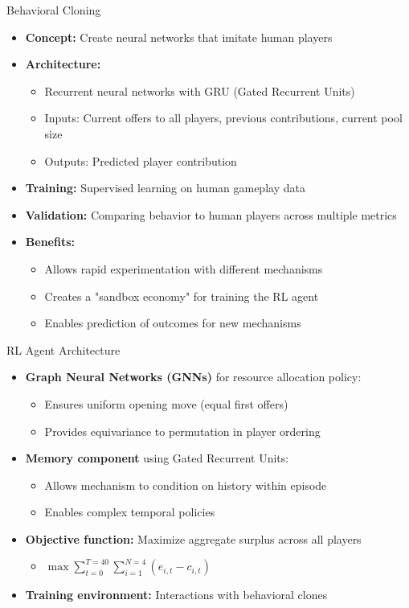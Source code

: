 \documentclass[aspectratio=169]{beamer} %
\begin{document}
\begin{frame}{Behavioral Cloning}
\begin{itemize}
    \item \textbf{Concept:} Create neural networks that imitate human players
    \item \textbf{Architecture:}
    \begin{itemize}
        \item Recurrent neural networks with GRU (Gated Recurrent Units)
        \item Inputs: Current offers to all players, previous contributions, current pool size
        \item Outputs: Predicted player contribution
    \end{itemize}
    \item \textbf{Training:} Supervised learning on human gameplay data
    \item \textbf{Validation:} Comparing behavior to human players across multiple metrics
    \item \textbf{Benefits:}
    \begin{itemize}
        \item Allows rapid experimentation with different mechanisms
        \item Creates a "sandbox economy" for training the RL agent
        \item Enables prediction of outcomes for new mechanisms
    \end{itemize}
\end{itemize}
\end{frame}

\begin{frame}{RL Agent Architecture}
\begin{itemize}
    \item \textbf{Graph Neural Networks (GNNs)} for resource allocation policy:
    \begin{itemize}
        \item Ensures uniform opening move (equal first offers)
        \item Provides equivariance to permutation in player ordering
    \end{itemize}
    \item \textbf{Memory component} using Gated Recurrent Units:
    \begin{itemize}
        \item Allows mechanism to condition on history within episode
        \item Enables complex temporal policies
    \end{itemize}
    \item \textbf{Objective function:} Maximize aggregate surplus across all players
    \begin{itemize}
        \item $\max \sum_{t=0}^{T=40}\sum_{i=1}^{N=4}(e_{i,t} - c_{i,t})$
    \end{itemize}
    \item \textbf{Training environment:} Interactions with behavioral clones
\end{itemize}
\end{frame}
\end{document}
